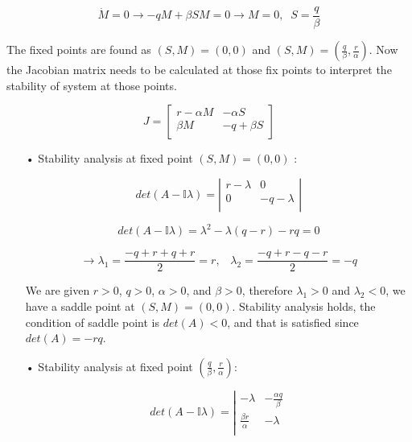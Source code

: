 \documentclass[12pt]{article}
\begin{document}
\begin{equation*}
\dot{M} = 0 \longrightarrow -qM + \beta SM = 0 \longrightarrow M =0, \;\; S=\frac{q}{\beta} 
\end{equation*}

The fixed points are found as $(S,M)=(0,0)$ and $(S,M)=(\frac{q}{\beta} ,\frac{r}{\alpha})$. Now the Jacobian matrix needs to be calculated at those fix points to interpret the stability of system at those points. 

\[
J=
\left[ {\begin{array}{cc }
r- \alpha M   &  -\alpha S \\
\beta M &  -q + \beta S  \\

\end{array} } \right]
\]

\begin{itemize}
\item[•] Stability analysis at fixed point $(S,M)=(0,0)$ :

\[
det(A -     \mathbb{I} \lambda )= 
\left| {\begin{array}{cc }
r- \lambda   &  0 \\
0 &  -q-\lambda  \\

\end{array} } \right|
\] 

\begin{equation*}
det(A -     \mathbb{I} \lambda ) = \lambda^{2} - \lambda (q-r) - rq = 0 
\end{equation*}


\begin{equation*}
 \longrightarrow \lambda_1 = \frac{-q+r+q+r}{2} = r, \;\;\; \lambda_2 = \frac{-q+r-q-r}{2} = -q
\end{equation*}

We are given $r>0$, $q>0$, $\alpha > 0$, and $\beta > 0$, therefore $\lambda_1 > 0 $ and $\lambda_2 <0$, we have a saddle point at $(S,M)=(0,0)$. Stability analysis holds, the condition of saddle point is $det(A)<0$, and that is satisfied since $det(A)=-rq$.

\item[•] Stability analysis at fixed point $(\frac{q}{\beta} ,\frac{r}{\alpha})$:

\[
det(A -     \mathbb{I} \lambda )= 
\left| {\begin{array}{cc }
-\lambda   &  - \frac{\alpha q}{\beta} \\
\frac{ \beta r}{\alpha} &  -\lambda  \\


\end{array}}\]
\end{itemize}
\end{document}
